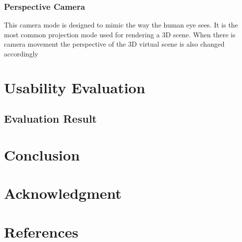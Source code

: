 \documentclass[conference]{IEEEtran}
\begin{document}
\subsubsection{Perspective Camera}
This camera mode is designed to mimic the way the human eye sees. It is the most common projection mode used for rendering a 3D scene. When there is camera movement the perspective of the 3D virtual scene is also changed accordingly
\section{Usability Evaluation}
\subsection{Evaluation Result}
\section{Conclusion}

\section*{Acknowledgment}

\section*{References}
\end{document}
